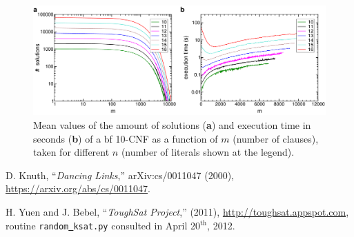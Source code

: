 \documentclass[12pt]{article}
\begin{document}
\begin{figure}[htbp]
  \begin{center}
    \includegraphics[width=15.2cm]{images/k10st.pdf}
    \caption{\small{Mean values of the amount of solutions ({\bf a}) and execution time in seconds ({\bf b}) of a {bf 10}-CNF as a function of $m$ (number of clauses), taken for different $n$ (number of literals shown at the legend).}}
    \label{fig:k10}
  \end{center}
\end{figure}



\begin{thebibliography}{2}

 D. Knuth, ``\emph{Dancing Links},'' arXiv:cs/0011047 (2000), \url{https://arxiv.org/abs/cs/0011047}.

 H. Yuen and J. Bebel, ``\emph{ToughSat Project},'' (2011), \url{http://toughsat.appspot.com}, routine \texttt{random\underline{ }ksat.py} consulted in April 20$^\text{th}$, 2012.

\end{thebibliography}
\end{document}
